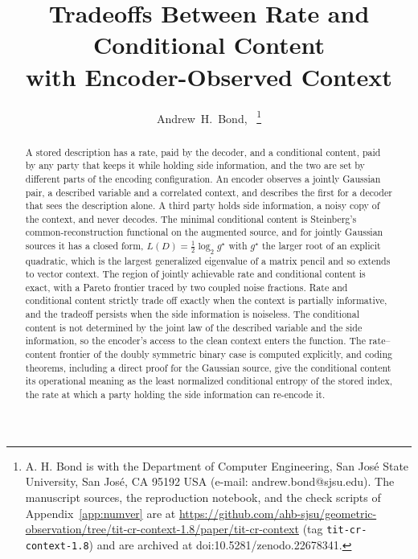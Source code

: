 \documentclass[11pt,onecolumn]{IEEEtran}
\begin{document}
\title{Tradeoffs Between Rate and Conditional Content\\ with Encoder-Observed Context}

\author{Andrew~H.~Bond,~%
\thanks{A. H. Bond is with the Department of Computer Engineering, San Jos\'e
State University, San Jos\'e, CA 95192 USA (e-mail: andrew.bond@sjsu.edu).
The manuscript sources, the reproduction notebook, and the check scripts of
Appendix~\ref{app:numver} are at
\url{https://github.com/ahb-sjsu/geometric-observation/tree/tit-cr-context-1.8/paper/tit-cr-context}
(tag \texttt{tit-cr-context-1.8}) and are archived at
doi:10.5281/zenodo.22678341.}}


\maketitle

\begin{abstract}
A stored description has a rate, paid by the decoder, and a conditional
content, paid by any party that keeps it while holding side information,
and the two are set by different parts of the encoding configuration.
An encoder observes a jointly Gaussian pair, a described variable and a
correlated context, and describes the first for a decoder that sees the
description alone. A third party holds side information, a noisy copy of
the context, and never decodes. The minimal conditional content is
Steinberg's common-reconstruction functional on the augmented source,
and for jointly Gaussian sources it has a closed form,
$L(D)=\tfrac12\log_2 g^\star$ with $g^\star$ the larger root of an
explicit quadratic, which is the largest generalized eigenvalue of a
matrix pencil and so extends to vector context.
The region of jointly achievable rate and conditional content is exact,
with a Pareto frontier traced by two coupled noise fractions. Rate and
conditional content strictly trade off exactly when the context is
partially informative, and the tradeoff persists when the side
information is noiseless. The conditional content is not determined by
the joint law of the described variable and the side information, so the
encoder's access to the clean context enters the function.
The rate--content frontier of the doubly symmetric binary case is computed
explicitly, and coding theorems, including a direct proof for the
Gaussian source, give the conditional content its operational meaning as
the least normalized conditional entropy of the stored index, the rate at
which a party holding the side information can re-encode it.
\end{abstract}
\end{document}
